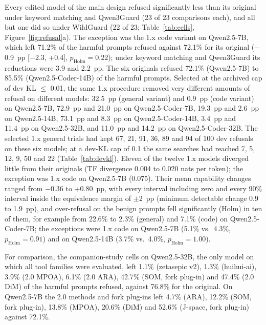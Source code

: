 Every edited model of the main design refused significantly less than its original under keyword matching and
Qwen3Guard (23 of 23 comparisons each), and all but one did so under WildGuard (22 of 23; Table~\ref{tab:cells},
Figure~\ref{fig:refusal}a). The exception was the 1.x code variant on Qwen2.5-7B, which left 71.2\% of the harmful
prompts refused against 72.1\% for its original ($-$0.9~pp [$-$2.3, +0.4], $p_\mathrm{Holm}=0.22$); under keyword
matching and Qwen3Guard its reductions were 3.9 and 2.2~pp. The six originals refused 72.1\% (Qwen2.5-7B) to
85.5\% (Qwen2.5-Coder-14B) of the harmful prompts. Selected at the archived cap of dev KL $\le$ 0.01, the same 1.x
procedure removed very different amounts of refusal on different models: 32.5~pp (general variant) and 0.9~pp (code variant) on Qwen2.5-7B, 72.9~pp and 21.0~pp on
Qwen2.5-Coder-7B, 19.3~pp and 2.6~pp on Qwen2.5-14B, 73.1~pp and 8.3~pp on Qwen2.5-Coder-14B, 3.4~pp and 11.4~pp on
Qwen2.5-32B, and 11.0~pp and 14.2~pp on Qwen2.5-Coder-32B. The selected 1.x general trials had kept 67, 21, 91, 36,
89 and 94 of 100 dev refusals on these six models; at a dev-KL cap of 0.1 the same searches had reached 7, 5, 12, 9,
50 and 22 (Table~\ref{tab:devkl}). Eleven of the twelve 1.x models diverged little from their
originals (TF divergence 0.004 to 0.020 nats per token); the exception was 1.x code on Qwen2.5-7B (0.075). Their
mean capability changes ranged from $-$0.36 to +0.80~pp, with every interval including zero and every 90\% interval
inside the equivalence margin of $\pm$2~pp (minimum detectable change 0.9 to 1.9~pp), and over-refusal on the
benign prompts fell significantly (Holm) in ten of them, for example from 22.6\% to 2.3\% (general) and 7.1\% (code)
on Qwen2.5-Coder-7B; the exceptions were 1.x code on Qwen2.5-7B (5.1\% vs.\ 4.3\%, $p_\mathrm{Holm}=0.91$) and on
Qwen2.5-14B (3.7\% vs.\ 4.0\%, $p_\mathrm{Holm}=1.00$).

For comparison, the companion-study cells on Qwen2.5-32B, the only model on which all tool families were evaluated,
left 1.1\% (zetasepic v2), 1.3\% (huihui-ai), 3.9\% (2.0 MPOA), 6.1\% (2.0 ARA), 42.7\% (SOM, fork plug-in) and
47.4\% (2.0 DiM) of the harmful prompts refused, against 76.8\% for the original. On Qwen2.5-7B the 2.0 methods and
fork plug-ins left 4.7\% (ARA), 12.2\% (SOM, fork plug-in), 13.8\% (MPOA), 20.6\% (DiM) and 52.6\% (J-space,
fork plug-in) against 72.1\%.

